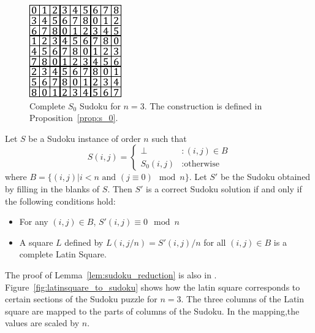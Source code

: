 \documentclass[runningheads,a4paper]{llncs}
\begin{document}
\begin{figure}
\centering
\label{fig:s_0}
\includegraphics[width=0.6\linewidth]{sudoku_s_0.pdf}
\caption{Complete $S_0$ Sudoku for $n = 3$. The construction is defined in Proposition~\ref{prop:s_0}.}
\end{figure}

\begin{lemma}
\label{lem:sudoku_reduction}
Let $S$ be a Sudoku instance of order $n$ such that
\begin{displaymath}
S(i,j) = \left\{
\begin{array}{lr}
\perp & : (i,j) \in B\\
S_0 (i,j) & : \text{otherwise}
\end{array}
\right.
\end{displaymath}
where $B = \{ (i,j) | i < n \text{ and } (j \equiv 0) \mod n \}$. Let $S'$ be the Sudoku obtained by filling in the blanks of $S$. Then $S'$ is a correct Sudoku solution if and only if the following conditions hold:
\begin{itemize}
\item For any $(i,j) \in B$, $S'(i,j) \equiv 0 \mod n$
\item A square $L$ defined by $L(i, j/n) = S'(i,j)/n$ for all $(i, j) \in B$ is a complete Latin Square.
\end{itemize}
\end{lemma}

The proof of Lemma~\ref{lem:sudoku_reduction} is also in \cite{takayuki2003complexity}. Figure~\ref{fig:latinsquare_to_sudoku} shows how the latin square corresponds to certain sections of the Sudoku puzzle for $n=3$. The three columns of the Latin square are mapped to the parts of columns of the Sudoku. In the mapping,the values are scaled by $n$. 
\end{document}
